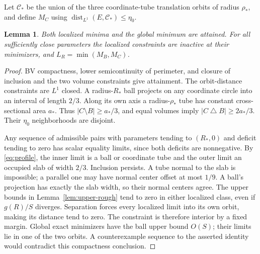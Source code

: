 \documentclass[11pt]{article}
\newcommand{\dist}{\operatorname{dist}}
\newtheorem{lemma}[theorem]{Lemma}
\theoremstyle{remark}\newtheorem{remark}[theorem]{Remark}
\numberwithin{equation}{section}
\begin{document}
Let $\mathcal C_*$ be the union of the three coordinate-tube translation
orbits of radius $\rho_*$, and define $M_C$ using
$\dist_{L^1}(E,\mathcal C_*)\leq\eta_0$.
\begin{lemma}\label{lem:localize}
Both localized minima and the global minimum are attained. For all
sufficiently close parameters the localized constraints are inactive at
their minimizers, and $L_R=\min(M_B,M_C)$.
\end{lemma}
\begin{proof}
BV compactness, lower semicontinuity of perimeter, and closure of inclusion
and the two volume constraints give attainment. The orbit-distance
constraints are $L^1$ closed. A radius-$R_*$ ball projects on any
coordinate circle into an interval of length $2/3$. Along its own axis
a radius-$\rho_*$ tube has constant cross-sectional area $a_*$.
Thus $|C\setminus B|\geq a_*/3$, and equal volumes imply
$|C\mathbin\triangle B|\geq2a_*/3$. Their $\eta_0$ neighborhoods
are disjoint.

Any sequence of admissible pairs with parameters tending to $(R_*,0)$
and deficit tending to zero has scalar equality limits, since both
deficits are nonnegative. By \eqref{eq:profile}, the inner limit is a
ball or coordinate tube and the outer limit an occupied slab of width
$2/3$. Inclusion persists. A tube normal to the slab is impossible;
a parallel one may have normal center offset at most $1/9$. A ball's
projection has exactly the slab width, so their normal centers agree.
The upper bounds in Lemma~\ref{lem:upper-rough} tend to zero in either
localized class, even if $g(R)/S$ diverges. Separation forces every
localized limit into its own orbit, making its distance tend to zero.
The constraint is therefore interior by a fixed margin. Global exact
minimizers have the ball upper bound $O(S)$; their limits lie in one of
the two orbits. A counterexample sequence to the asserted identity would
contradict this compactness conclusion.
\end{proof}
\end{document}
